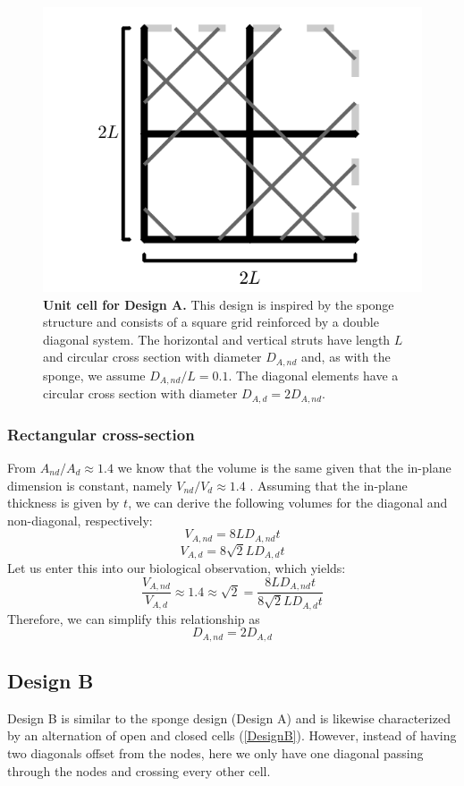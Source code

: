 \documentclass[10pt,twoside]{fernandes_supp}
\begin{document}
\begin{figure}[H]
    \centering
    \includegraphics[width=0.45\linewidth]{SFig2.png}
    \caption{{\bf Unit cell for Design A.} This design is inspired by the sponge structure and consists of a square grid  reinforced by a double diagonal system. The horizontal and vertical struts have length $L$ and circular cross section with diameter $D_{A,nd}$ and, as with the sponge, we assume $D_{A,nd}/L=0.1$. The diagonal elements have a circular cross section  with diameter $D_{A,d}=2 D_{A,nd}$.}
    \label{DesignA}
\end{figure}

\subsubsection{Rectangular cross-section}
From $A_{nd}/A_d\approx 1.4$ we know that the volume is the same given that the in-plane dimension is constant, namely $V_{nd}/V_d\approx 1.4$ . Assuming that the in-plane thickness is given by $t$, we can derive the following volumes for the diagonal and non-diagonal, respectively:
\begin{equation}
	V_{A,nd}=8LD_{A,nd}t
\end{equation}
\begin{equation}
	V_{A,d}=8\sqrt{2}LD_{A,d}t
\end{equation}
Let us enter this into our biological observation, which yields:
\begin{equation}
	\frac{V_{A,nd}}{V_{A,d}}\approx 1.4\approx\sqrt{2}=\frac{8LD_{A,nd}t}{8\sqrt{2}LD_{A,d}t}
\end{equation}
Therefore, we can simplify this relationship as
\begin{equation}
	D_{A,nd}=2D_{A,d}
\end{equation}

\subsection{Design B}
Design B is similar to the sponge design (Design A) and is likewise characterized by an alternation of open and closed cells (\cref{DesignB}). However, instead of having two diagonals offset from the nodes, here we only have one diagonal passing through the nodes and crossing every other cell. 
\end{document}
